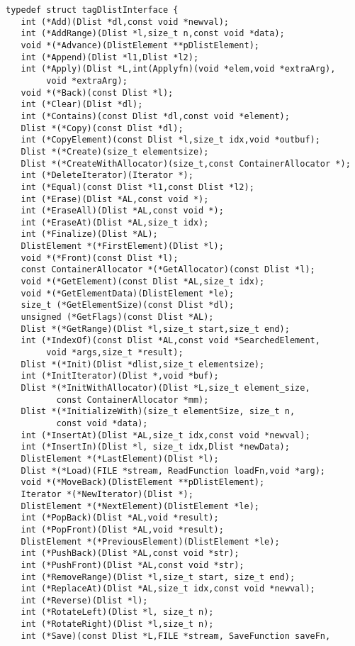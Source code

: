 \begin{verbatim}
typedef struct tagDlistInterface {
   int (*Add)(Dlist *dl,const void *newval);
   int (*AddRange)(Dlist *l,size_t n,const void *data);
   void *(*Advance)(DlistElement **pDlistElement);
   int (*Append)(Dlist *l1,Dlist *l2);
   int (*Apply)(Dlist *L,int(Applyfn)(void *elem,void *extraArg),
        void *extraArg);
   void *(*Back)(const Dlist *l);
   int (*Clear)(Dlist *dl);
   int (*Contains)(const Dlist *dl,const void *element);
   Dlist *(*Copy)(const Dlist *dl);
   int (*CopyElement)(const Dlist *l,size_t idx,void *outbuf);
   Dlist *(*Create)(size_t elementsize);
   Dlist *(*CreateWithAllocator)(size_t,const ContainerAllocator *);
   int (*DeleteIterator)(Iterator *);
   int (*Equal)(const Dlist *l1,const Dlist *l2);
   int (*Erase)(Dlist *AL,const void *);
   int (*EraseAll)(Dlist *AL,const void *);
   int (*EraseAt)(Dlist *AL,size_t idx);
   int (*Finalize)(Dlist *AL);
   DlistElement *(*FirstElement)(Dlist *l);
   void *(*Front)(const Dlist *l);
   const ContainerAllocator *(*GetAllocator)(const Dlist *l);
   void *(*GetElement)(const Dlist *AL,size_t idx);
   void *(*GetElementData)(DlistElement *le);
   size_t (*GetElementSize)(const Dlist *dl);
   unsigned (*GetFlags)(const Dlist *AL);
   Dlist *(*GetRange)(Dlist *l,size_t start,size_t end);
   int (*IndexOf)(const Dlist *AL,const void *SearchedElement,
        void *args,size_t *result);
   Dlist *(*Init)(Dlist *dlist,size_t elementsize);
   int (*InitIterator)(Dlist *,void *buf);
   Dlist *(*InitWithAllocator)(Dlist *L,size_t element_size,
          const ContainerAllocator *mm);
   Dlist *(*InitializeWith)(size_t elementSize, size_t n,
          const void *data);
   int (*InsertAt)(Dlist *AL,size_t idx,const void *newval);
   int (*InsertIn)(Dlist *l, size_t idx,Dlist *newData);
   DlistElement *(*LastElement)(Dlist *l);
   Dlist *(*Load)(FILE *stream, ReadFunction loadFn,void *arg);
   void *(*MoveBack)(DlistElement **pDlistElement);
   Iterator *(*NewIterator)(Dlist *);
   DlistElement *(*NextElement)(DlistElement *le);
   int (*PopBack)(Dlist *AL,void *result);
   int (*PopFront)(Dlist *AL,void *result);
   DlistElement *(*PreviousElement)(DlistElement *le);
   int (*PushBack)(Dlist *AL,const void *str);
   int (*PushFront)(Dlist *AL,const void *str);
   int (*RemoveRange)(Dlist *l,size_t start, size_t end);
   int (*ReplaceAt)(Dlist *AL,size_t idx,const void *newval);
   int (*Reverse)(Dlist *l);
   int (*RotateLeft)(Dlist *l, size_t n);
   int (*RotateRight)(Dlist *l,size_t n);
   int (*Save)(const Dlist *L,FILE *stream, SaveFunction saveFn,

\end{verbatim}
